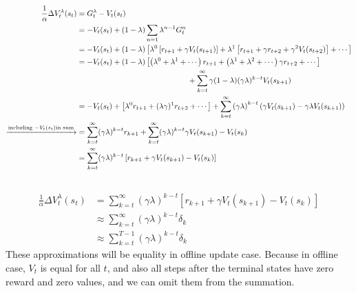 \documentclass{article}
\begin{document}
\subsection{}
\begin{align*}
\frac{1}{\alpha} \Delta V_t^\lambda (s_t) &= G_t^\lambda - V_t(s_t)\\
&= -V_t(s_t) + (1-\lambda) \sum_{n=1} \lambda^{n-1} G_t^n\\
&= -V_t(s_t) + (1-\lambda) \left[ \lambda^0 \left[ r_{t+1} + \gamma V_t(s_{t+1}) \right] + \lambda^1 \left[ r_{t+1} + \gamma r_{t+2} + \gamma^2 V_t(s_{t+2}) \right] + \cdots \right]\\
&= -V_t(s_t) + (1-\lambda) \left[ \left(\lambda^0 + \lambda^1 + \cdots \right) r_{t+1} + \left(\lambda^1 + \lambda^2 + \cdots \right) \gamma r_{t+2} + \cdots \right]\\
& \hspace*{2in} + \sum_{k=t}^{\infty} \gamma (1-\lambda) (\gamma \lambda)^{k-t} V_t(s_{k+1})\\
&= -V_t(s_t) + \left[\lambda^0 r_{t+1} + (\lambda \gamma)^1 r_{t+2} + \cdots\right]
+ \sum_{k=t}^{\infty} \left(\gamma \lambda\right)^{k-t} \left( \gamma V_t(s_{k+1}) - \gamma \lambda V_t(s_{k+1}) \right)\\
\xrightarrow{\text{including } -V_t(s_t) \text{in sum}}&= \sum_{k=t}^{\infty} (\gamma \lambda)^{k-t} r_{k+1} + \sum_{k=t}^{\infty} (\gamma \lambda)^{k-t} \gamma V_t(s_{k+1}) - V_t(s_k)\\
&= \sum_{k=t}^{\infty} (\gamma \lambda)^{k-t} \left[ r_{k+1} + \gamma V_t(s_{k+1})  - V_t(s_k)\right]
\end{align*}

\subsection{}
\begin{align*}
\frac{1}{\alpha} \Delta V_t^\lambda (s_t) &= \sum_{k=t}^{\infty} (\gamma \lambda)^{k-t} \left[ r_{k+1} + \gamma V_t(s_{k+1}) - V_t(s_k)\right]\\
&\approx \sum_{k=t}^{\infty} (\gamma \lambda)^{k-t} \delta_k\\
&\approx \sum_{k=t}^{T - 1} (\gamma \lambda)^{k-t} \delta_k
\end{align*}
These approximations will be equality in offline update case.
Because in offline case, \(V_t\) is equal for all \(t\), and also all steps after the terminal states have zero reward and zero values, and we can omit them from the summation.
\end{document}

